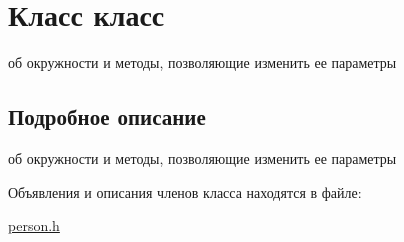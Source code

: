 \hypertarget{class_xD0_xBA_xD0_xBB_xD0_xB0_xD1_x81_xD1_x81}{\section{Класс класс}
\label{class_xD0_xBA_xD0_xBB_xD0_xB0_xD1_x81_xD1_x81}
}


об окружности и методы, позволяющие изменить ее параметры  




\subsection{Подробное описание}
об окружности и методы, позволяющие изменить ее параметры 

Объявления и описания членов класса находятся в файле\-:\begin{DoxyCompactItemize}
\item 
\hyperlink{person_8h}{person.\-h}\end{DoxyCompactItemize}
